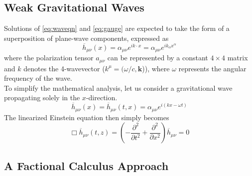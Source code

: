 \documentclass[a4paper,12pt]{extarticle}
\newcommand{\mn}{{\mu\nu}}
\numberwithin{equation}{subsection}
\begin{document}
\subsection{Weak Gravitational Waves}
Solutions of \eqref{eq:waveqn} and \eqref{eq:gauge} are expected to take the form of a superposition of plane-wave components, expressed as
\begin{equation}
\overline h_\mn(x)=\alpha_\mn e^{ik\cdot x}=\alpha_\mn e^{ik_\alpha x^\alpha}
\end{equation}
where the polarization tensor $a_\mn$ can be represented by a constant $4\times 4$ matrix and $k$ denotes the 4-wavevector ($k^\mu=(\omega/c,\bm k$)), where $\omega$ represents the angular frequency of the wave.\\
To simplify the mathematical analysis, let us consider a gravitational wave propagating solely in the $x$-direction.
\begin{equation}
\label{eq:z}
\overline h_\mn(x)=\overline h_\mn(t,x)=\alpha_\mn e^{i(kx-\omega t)}
\end{equation}
The linearized Einstein equation then simply becomes
\begin{equation}
\Box \overline h_\mn(t,z)=\left(-\frac{\partial^2}{\partial t^2}+\frac{\partial^2}{\partial x^2}\right)\overline h_\mn=0
\end{equation}
\subsection{A Factional Calculus Approach}
\end{document}
